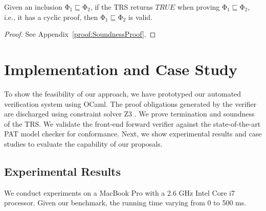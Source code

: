 \documentclass[acmsmall,10pt,review]{acmart}
\newcommand{\effect}{{\ensuremath{\mathrm{\Phi}}}}
\newcommand{\code}[1]{{\tt{\ensuremath{\m{#1}}}}}
\newcommand{\CONTAIN}{\sqsubseteq}
\newcommand{\m}{\mathit}
\newcommand\appref[1]{Appendix~\textcolor{blue}{\ref{#1}}}
\begin{document}
{ \begin{theorem}[Soundness]\label{Cyclicsoundness}
Given an inclusion \code{\effect_1 \CONTAIN \effect_2}, if the TRS returns \code{TRUE} when proving \code{\effect_1 \CONTAIN \effect_2}, i.e., it has a cyclic proof, 
then \code{\effect_1 \CONTAIN \effect_2} is valid.
\end{theorem}


\begin{proof}
See %
\appref{proof:SoundnessProof}.
\end{proof}






\section{Implementation and Case Study}
\label{sec:Evaluation}


To show the feasibility of our approach, we have prototyped 
our automated verification system 
using OCaml. The proof obligations generated by the verifier 
are discharged using constraint solver Z3 
\citep{DBLP:conf/tacas/MouraB08}. 
We prove termination and soundness of the TRS. We validate 
the front-end forward verifier against the state-of-the-art PAT 
\cite{DBLP:conf/cav/SunLDP09} model checker for conformance. 
Next, we show experimental results and case studies to evaluate the 
capability of our proposals. 

\subsection{Experimental Results}
\label{subsec:Experimental_Results}

We conduct experiments on a MacBook Pro with a 2.6 GHz Intel Core i7 processor. Given our benchmark, the running time varying from 0 to 500 ms. 


}
\end{document}
